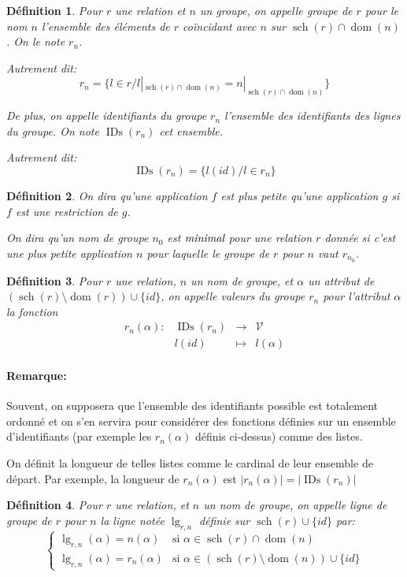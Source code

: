 \documentclass[french]{article}
\DeclareMathOperator{\dom}{dom}
\DeclareMathOperator{\s}{sch}
\DeclareMathOperator{\ids}{IDs}
\DeclareMathOperator{\lgr}{lg}
\newcommand{\val}{\mathcal{V}}
\newcommand{\cip}{\cup \{id\}}
\newtheorem{defi}{Définition}
\begin{document}
\begin{defi}
	Pour $r$ une relation et $n$ un groupe, on appelle
	\emph{groupe de $r$ pour le nom $n$} l'ensemble
	des éléments de $r$ coïncidant avec $n$ 
	sur $\s(r)\cap\dom(n)$. On le note $r_n$.
	
	Autrement dit:
	$$
	r_n = \{l \in r / l|_{\s(r)\cap\dom(n)}  = n|_{\s(r)\cap\dom(n)} \}
	$$
	
	De plus, on appelle \emph{identifiants du groupe $r_n$} l'ensemble
	des identifiants des lignes du groupe. On note $\ids(r_n)$ cet ensemble.
	
	Autrement dit:
	$$
	\ids(r_n) = \{ l(id) / l \in r_n \}
	$$
\end{defi}

\begin{defi}
	On dira qu'une application $f$ est \emph{plus petite}
	qu'une application $g$ si $f$ est une restriction de $g$.
	
	On dira qu'un nom de groupe $n_0$ est $\emph{minimal}$
	pour une relation $r$ donnée
	si c'est une plus petite application $n$ pour laquelle
	le groupe de $r$ pour $n$ vaut $r_{n_0}$.
\end{defi}

\begin{defi}
	Pour $r$ une relation, $n$ un nom de groupe,
	et $\alpha$ un attribut de
	$(\s(r) \setminus \dom(r)) \cup \{id\}$,
	on appelle \emph{valeurs du groupe $r_n$ pour
		l'attribut $\alpha$}
	la fonction
	$$
	\begin{array}{llcl}
	r_n(\alpha) : & \ids(r_n) & \rightarrow & \val \\
			& l(id) & \mapsto & l(\alpha)
	\end{array}
	$$
\end{defi}
	
\paragraph{Remarque:}
Souvent, on supposera que l'ensemble des identifiants possible
est totalement ordonné et on s'en servira pour considérer
des fonctions définies sur un ensemble d'identifiants
(par exemple les $r_n(\alpha)$ définis ci-dessus) 
comme des listes.

On définit la longueur de telles listes comme le cardinal
de leur ensemble de départ.
Par exemple, la longueur de $r_n(\alpha)$
est $|r_n(\alpha)| = |\ids(r_n)|$

\begin{defi}
	Pour $r$ une relation, et $n$ un nom de groupe,
	on appelle \emph{ligne de groupe de $r$ pour $n$}
	la ligne notée $\lgr_{r,n}$ définie sur $\s(r) \cip$ par:
	$$
	\left\lbrace
	\begin{array}{ll}
	\lgr_{r, n}(\alpha) = n(\alpha) & \text{si $\alpha \in \s(r) \cap \dom(n)$} \\
	\lgr_{r, n}(\alpha) = r_n(\alpha) & \text{si $\alpha \in (\s(r) \setminus \dom(n)) \cip$}
	\end{array}
	\right.
	$$ 
\end{defi}
\end{document}

